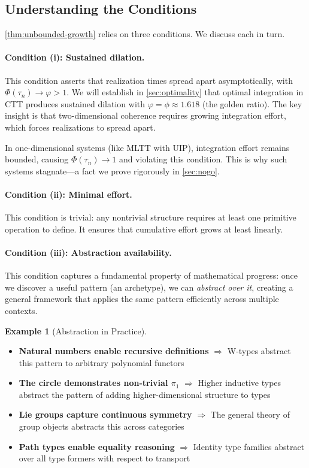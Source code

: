 \documentclass[11pt]{article}
\theoremstyle{definition}
\newtheorem{example}[theorem]{Example}
\theoremstyle{remark}
\begin{document}
\subsection{Understanding the Conditions}

\cref{thm:unbounded-growth} relies on three conditions. We discuss each in turn.

\paragraph{Condition (i): Sustained dilation.}

This condition asserts that realization times spread apart asymptotically, with $\Phi(\tau_n) \to \varphi > 1$. We will establish in \cref{sec:optimality} that optimal integration in CTT produces sustained dilation with $\varphi = \phi \approx 1.618$ (the golden ratio). The key insight is that two-dimensional coherence requires growing integration effort, which forces realizations to spread apart.

In one-dimensional systems (like MLTT with UIP), integration effort remains bounded, causing $\Phi(\tau_n) \to 1$ and violating this condition. This is why such systems stagnate---a fact we prove rigorously in \cref{sec:nogo}.

\paragraph{Condition (ii): Minimal effort.}

This condition is trivial: any nontrivial structure requires at least one primitive operation to define. It ensures that cumulative effort grows at least linearly.

\paragraph{Condition (iii): Abstraction availability.}

This condition captures a fundamental property of mathematical progress: once we discover a useful pattern (an archetype), we can \emph{abstract over it}, creating a general framework that applies the same pattern efficiently across multiple contexts.

\begin{example}[Abstraction in Practice]
\label{ex:abstraction-practice}
\begin{itemize}
\item \textbf{Natural numbers enable recursive definitions} $\Rightarrow$ W-types abstract this pattern to arbitrary polynomial functors
\item \textbf{The circle demonstrates non-trivial $\pi_1$} $\Rightarrow$ Higher inductive types abstract the pattern of adding higher-dimensional structure to types
\item \textbf{Lie groups capture continuous symmetry} $\Rightarrow$ The general theory of group objects abstracts this across categories
\item \textbf{Path types enable equality reasoning} $\Rightarrow$ Identity type families abstract over all type formers with respect to transport
\end{itemize}
\end{example}
\end{document}
